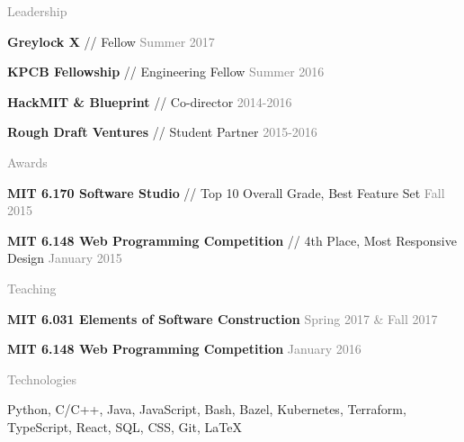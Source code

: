 \documentclass[11pt]{article}
\newcommand{\rsection}[1]{\vspace{1.5em}\textcolor{gray}{\Large \robotoslab #1}\vspace{0.5em}}
\newcommand{\bt}[1]{\textbf{#1}} %
\newcommand{\gap}[0]{\vspace{0.3em}} %
\newcommand{\sep}[0]{ // } %
\newcommand{\gray}[1]{\textcolor{gray}{#1}}
\begin{document}
\rsection{Leadership}

\bt{Greylock X}\sep Fellow \hfill \gray{Summer 2017}

\gap

\bt{KPCB Fellowship}\sep Engineering Fellow \hfill \gray{Summer 2016}

\gap

\bt{HackMIT \& Blueprint}\sep Co-director \hfill \gray{2014-2016}

\gap

\bt{Rough Draft Ventures}\sep Student Partner \hfill \gray{2015-2016}


\rsection{Awards}

\bt{MIT 6.170 Software Studio} \sep Top 10 Overall Grade, Best Feature Set \hfill \gray{Fall 2015}

\gap

\bt{MIT 6.148 Web Programming Competition} \sep 4th Place, Most Responsive Design \hfill \gray{January 2015}


\rsection{Teaching}

\bt{MIT 6.031 Elements of Software Construction} \hfill \gray{Spring 2017 \& Fall 2017}

\gap

\bt{MIT 6.148 Web Programming Competition} \hfill \gray{January 2016}


\rsection{Technologies}

Python, C/C++, Java, JavaScript, Bash, Bazel, Kubernetes, Terraform, TypeScript, React, SQL, CSS, Git, {\selectfont\LaTeX}
\end{document}
